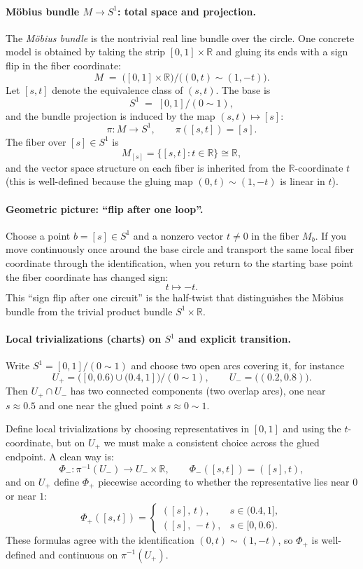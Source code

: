 \documentclass[12pt,a4paper]{article}
\theoremstyle{plain}
\theoremstyle{definition}      %
\begin{document}
	\paragraph{Möbius bundle $M\to S^1$: total space and projection.}
	The \emph{Möbius bundle} is the nontrivial real line bundle over the circle. One concrete
	model is obtained by taking the strip $[0,1]\times\mathbb{R}$ and gluing its ends with a
	sign flip in the fiber coordinate:
	\[
	M \;=\;\bigl([0,1]\times\mathbb{R}\bigr)\Big/\bigl((0,t)\sim(1,-t)\bigr).
	\]
	Let $[s,t]$ denote the equivalence class of $(s,t)$. The base is
	\[
	S^1 \;=\; [0,1]/(0\sim 1),
	\]
	and the bundle projection is induced by the map $(s,t)\mapsto [s]$:
	\[
	\pi:M\to S^1,\qquad \pi([s,t])=[s].
	\]
	The fiber over $[s]\in S^1$ is
	\[
	M_{[s]}=\{[s,t]:t\in\mathbb{R}\}\cong \mathbb{R},
	\]
	and the vector space structure on each fiber is inherited from the $\mathbb{R}$-coordinate
	$t$ (this is well-defined because the gluing map $(0,t)\sim(1,-t)$ is linear in $t$).
	
	\paragraph{Geometric picture: ``flip after one loop''.}
	Choose a point $b=[s]\in S^1$ and a nonzero vector $t\neq 0$ in the fiber $M_b$.
	If you move continuously once around the base circle and transport the same local fiber
	coordinate through the identification, when you return to the starting base point the
	fiber coordinate has changed sign:
	\[
	t \longmapsto -t.
	\]
	This ``sign flip after one circuit'' is the half-twist that distinguishes the Möbius
	bundle from the trivial product bundle $S^1\times\mathbb{R}$.
	
	\paragraph{Local trivializations (charts) on $S^1$ and explicit transition.}
	Write $S^1=[0,1]/(0\sim 1)$ and choose two open arcs covering it, for instance
	\[
	U_+ = \bigl([0,0.6)\cup(0.4,1]\bigr)/(0\sim 1),\qquad
	U_- = \bigl((0.2,0.8)\bigr).
	\]
	Then $U_+\cap U_-$ has two connected components (two overlap arcs), one near $s\approx 0.5$
	and one near the glued point $s\approx 0\sim 1$.
	
	Define local trivializations by choosing representatives in $[0,1]$ and using the
	$t$-coordinate, but on $U_+$ we must make a consistent choice across the glued endpoint.
	A clean way is:
	\[
	\Phi_-:\pi^{-1}(U_-)\to U_-\times\mathbb{R},\qquad \Phi_-([s,t])=([s],t),
	\]
	and on $U_+$ define $\Phi_+$ piecewise according to whether the representative lies near
	$0$ or near $1$:
	\[
	\Phi_+([s,t])=
	\begin{cases}
		([s],\,t), & s\in(0.4,1],\\[4pt]
		([s],\,-t), & s\in[0,0.6).
	\end{cases}
	\]
	These formulas agree with the identification $(0,t)\sim(1,-t)$, so $\Phi_+$ is well-defined
	and continuous on $\pi^{-1}(U_+)$.
	
\end{document}
